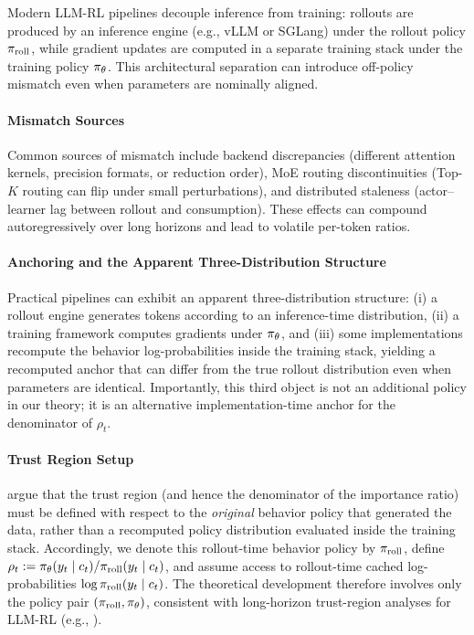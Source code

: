 Modern LLM-RL pipelines decouple inference from training: rollouts are produced by an inference engine (e.g., vLLM or SGLang) under the
rollout policy $\pi_{\mathrm{roll}}$, while gradient updates are computed in a separate training stack under the training policy $\pi_{\theta}$. This
architectural separation can introduce off-policy mismatch even when parameters are nominally aligned.

\paragraph{Mismatch Sources}
Common sources of mismatch include backend discrepancies (different attention kernels, precision formats, or reduction order), MoE routing
discontinuities (Top-$K$ routing can flip under small perturbations), and distributed staleness (actor--learner lag between rollout and
consumption). These effects can compound autoregressively over long horizons and lead to volatile per-token ratios.

\paragraph{Anchoring and the Apparent Three-Distribution Structure}
Practical pipelines can exhibit an apparent three-distribution structure: (i) a rollout engine generates tokens according to an
inference-time distribution, (ii) a training framework computes gradients under $\pi_{\theta}$, and (iii) some implementations recompute the
behavior log-probabilities inside the training stack, yielding a recomputed anchor that can differ from the true rollout distribution even
when parameters are identical. Importantly, this third object is not an additional policy in our theory; it is an alternative
implementation-time anchor for the denominator of $\rho_t$.

\paragraph{Trust Region Setup}
\citet{qi2026rethinkingtrustregionllm} argue that the trust region (and hence the denominator of the importance ratio) must be defined with
respect to the \emph{original} behavior policy that generated the data, rather than a recomputed policy distribution evaluated inside the
training stack. Accordingly, we denote this rollout-time behavior policy by $\pi_{\mathrm{roll}}$, define
$\rho_t := \pi_{\theta}(y_t\mid c_t) / \pi_{\mathrm{roll}}(y_t\mid c_t)$, and assume access to rollout-time cached log-probabilities
$\log \pi_{\mathrm{roll}}(y_t\mid c_t)$. The theoretical development therefore involves only the policy pair $(\pi_{\mathrm{roll}},\pi_{\theta})$, consistent with
long-horizon trust-region analyses for LLM-RL (e.g., \citet{li2025trm}).

